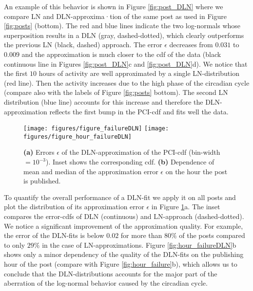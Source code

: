 \documentclass[twoside,11pt]{article}
\begin{document}
An example of this behavior is shown in Figure \ref{fig:post_DLN}
where we compare LN and DLN-ap\-prox\-i\-ma\-·tion of the same post as used in
Figure \ref{fig:posts} (bottom).  The red and blue lines indicate the
two log-normals whose superposition results in a DLN (gray,
dashed-dotted), which clearly outperforms the previous LN (black,
dashed) approach.  The error $\epsilon$ decreases from $0.031$ to
$0.009$ and the approximation is much closer to the cdf of the data
(black continuous line in Figures \ref{fig:post_DLN}c and
\ref{fig:post_DLN}d). We notice that the first $10$ hours of activity
are well approximated by a single LN-distribution (red line).
Then the activity increases due to the high phase of the circadian
cycle (compare also with the labels of Figure \ref{fig:posts} bottom).
The second LN distribution (blue line) accounts for this
increase and therefore the DLN-approximation reflects the first bump
in the PCI-cdf and fits well the data.

\begin{figure}[!tb]\centering
  \texttt{[image: figures/figure\_failureDLN]}
  \texttt{[image: figures/figure\_hour\_failureDLN]}
  \caption{\textbf{(a)} Errors $\epsilon$ of the DLN-approximation of
    the PCI-cdf (bin-width $=10^{-3}$). Inset shows the corresponding
    cdf.  \textbf{(b)} Dependence of mean and median of the
    approximation error $\epsilon$ on the hour the post is published.}
\label{fig:hour_failureDLN}
\label{fig:hist_failureDLN}
\end{figure}

To quantify the overall performance of a DLN-fit we apply it on all
posts and plot the distribution of its approximation error $\epsilon$
in Figure \ref{fig:hist_failureDLN}a. The inset compares the
error-cdfs of DLN (continuous) and LN-approach (dashed-dotted). We
notice a significant improvement of the approximation quality. For
example, the error of the DLN-fits is below $0.02$ for more than
$80\%$ of the posts compared to only $29\%$ in the case of
LN-approximations.  Figure \ref{fig:hour_failureDLN}b shows only a
minor dependency of the quality of the DLN-fits on the publishing hour
of the post (compare with Figure \ref{fig:hour_failure}b), which
allows us to conclude that the DLN-distributions accounts for the
major part of the aberration of the log-normal behavior caused by the
circadian cycle.
\end{document}
